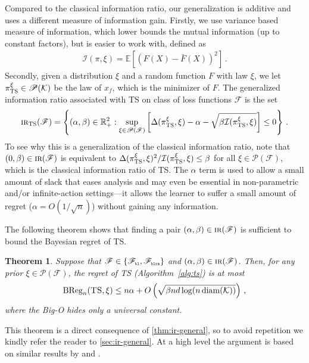 \documentclass[letter, 12pt]{report}
\newcommand{\pr}{\text{\tiny\texttt{r}}}
\newcommand{\pb}{\text{\tiny\texttt{b}}}
\newcommand{\pl}{\text{\tiny\texttt{l}}}
\renewcommand{\pm}{\text{\tiny\texttt{m}}}
\newcommand{\R}{\mathbb R}
\newcommand{\BReg}{\textrm{BReg}}
\newcommand{\E}{\mathbb E}
\newcommand{\cK}{\mathcal K}
\newcommand{\sF}{\mathscr F}
\newcommand{\sP}{\mathscr P}
\newcommand{\diam}{\operatorname{diam}}
\newcommand{\I}{\mathcal{I}}
\newcommand{\1}{\mathbf{1}}
\newcommand{\IR}{\operatorname{\textsc{ir}}}
\newcommand{\ts}{\textsc{TS}\xspace}
\theoremstyle{plain}
\newtheorem{theorem}{Theorem}
\theoremstyle{definition}
\theoremstyle{remark}
\begin{document}
Compared to the classical information ratio, our generalization is additive and uses a different measure of information gain.
Firstly, we use variance based measure of information, which lower bounds the mutual information (up to constant factors), but is easier to work with, defined as
\begin{align*}
    \I(\pi, \xi) = \E\left[(F(X) - \bar F(X))^2\right]\,.
\end{align*}
Secondly, given a distribution $\xi$ and a random function $F$ with law $\xi$, we let $\pi^\xi_\ts \in \sP(\cK)$ be the law of $x_f$, which is the minimizer of $F$.
The generalized information ratio associated with \ts on class of loss functions $\sF$ is the set
\begin{align*}
    \IR_\ts(\sF) = \left\{(\alpha, \beta) \in \R_+^2 : \sup_{\xi \in \sP(\sF)} \left[\Delta(\pi^\xi_\ts, \xi) - \alpha - \sqrt{\beta \I(\pi^\xi_\ts, \xi)}\right] \leq 0 \right\} \,.
\end{align*}
To see why this is a generalization of the classical information ratio, note
that $(0, \beta) \in \IR(\sF)$ is equivalent to $\Delta(\pi_\ts^\xi, \xi)^2 / \I(\pi_\ts^\xi, \xi) \leq \beta$ for all $\xi \in \sP(\sF)$, which is the classical information ratio of \ts{}.
The $\alpha$ term is used to allow a small amount of slack that eases analysis and may even be essential in non-parametric and/or infinite-action settings---it allows the learner to suffer a small amount of regret ($\alpha = O(1/\sqrt{n})$) without gaining any information.

The following theorem shows that finding a pair $(\alpha, \beta) \in \IR(\sF)$ is sufficient to bound the Bayesian regret of \ts{}.
\begin{theorem}\label{thm:ts-ir-regret}
    Suppose that $\sF \in \{\sF_{\pb\pl}, \sF_{\pb\pl\pr\pm}\}$ and $(\alpha, \beta) \in \IR(\sF)$.
    Then, for any prior $\xi \in \sP(\sF)$, the regret of \ts{} (Algorithm~\ref{alg:ts}) is at most
    \begin{align*}
        \BReg_n(\ts, \xi) \leq n \alpha + O\left(\sqrt{\beta n d \log(n \diam(\cK))}\right) \,,
    \end{align*}
    where the Big-O hides only a universal constant.
\end{theorem}
This theorem is a direct consequence of \cref{thm:ir-general}, so to avoid repetition we kindly refer the reader to \cref{sec:ir-general}.
At a high level the argument is based on similar results by \cite{BDKP15} and \cite{BE18}.
\end{document}
